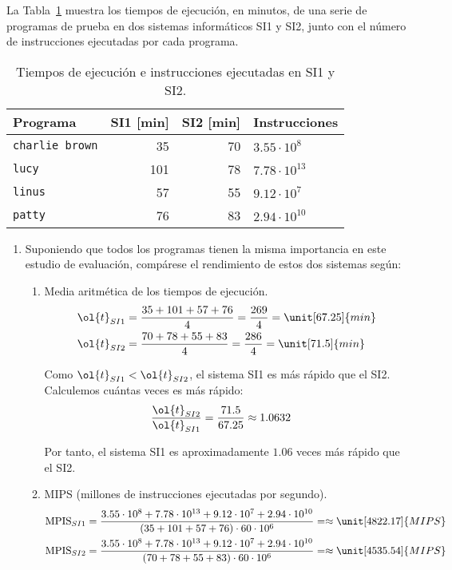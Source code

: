 \begin{ejercicio}\label{ej:4.7}
La Tabla~\ref{tab:ej:4.7} muestra los tiempos de ejecución, en minutos, de una serie de programas de prueba en dos sistemas informáticos SI1 y SI2, junto con el número de instrucciones ejecutadas por cada programa.
\begin{table}[h]
\centering
\begin{tabular}{@{}lrrl@{}}
\toprule
Programa & SI1 [min] & SI2 [min] & Instrucciones\\
\midrule
\verb|charlie brown| & 35 & 70 & $3.55 \cdot 10^8$ \\
\verb|lucy| & 101 & 78 & $7.78 \cdot 10^{13}$ \\
\verb|linus| & 57 & 55 & $9.12 \cdot 10^7$ \\
\verb|patty| & 76 & 83 & $2.94 \cdot 10^{10}$ \\ \bottomrule
\end{tabular}
\caption{Tiempos de ejecución e instrucciones ejecutadas en SI1 y SI2.}
\label{tab:ej:4.7}
\end{table}
\begin{enumerate}
    \item Suponiendo que todos los programas tienen la misma importancia en este estudio de evaluación, compárese el rendimiento de estos dos sistemas según:
    \begin{enumerate}
        \item Media aritmética de los tiempos de ejecución.
        \begin{align*}
            \ol{t}_{SI1} &= \dfrac{35 + 101 + 57 + 76}{4} = \dfrac{269}{4} = \unit[67.25]{min}\\
            \ol{t}_{SI2} &= \dfrac{70 + 78 + 55 + 83}{4} = \dfrac{286}{4} = \unit[71.5]{min}
        \end{align*}

        Como $\ol{t}_{SI1} < \ol{t}_{SI2}$, el sistema SI1 es más rápido que el SI2. Calculemos cuántas veces es más rápido:
        \begin{align*}
            \dfrac{\ol{t}_{SI2}}{\ol{t}_{SI1}} &= \dfrac{71.5}{67.25} \approx 1.0632
        \end{align*}

        Por tanto, el sistema SI1 es aproximadamente $1.06$ veces más rápido que el SI2.
        

        \item MIPS (millones de instrucciones ejecutadas por segundo).
        \begin{align*}
            \text{MPIS}_{SI1} = \dfrac{3.55 \cdot 10^8 + 7.78 \cdot 10^{13} + 9.12 \cdot 10^7 + 2.94 \cdot 10^{10}}{(35 + 101 + 57 + 76) \cdot 60\cdot 10^6} &= \approx \unit[4822.17]{MIPS}\\
            \text{MPIS}_{SI2} = \dfrac{3.55 \cdot 10^8 + 7.78 \cdot 10^{13} + 9.12 \cdot 10^7 + 2.94 \cdot 10^{10}}{(70 + 78 + 55 + 83) \cdot 60\cdot 10^6} &= \approx \unit[4535.54]{MIPS}
        \end{align*}


\end{enumerate}
\end{enumerate}
\end{ejercicio}
